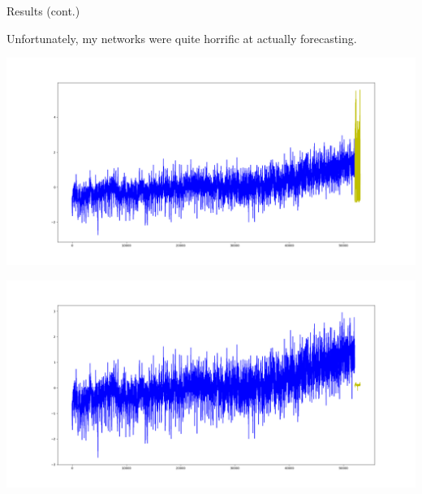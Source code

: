 \documentclass{beamer}
\begin{document}
\begin{frame}{Results (cont.)}

  Unfortunately, my networks were quite horrific at actually forecasting.\pause

  \begin{center}
    \includegraphics[scale=0.14]{erratic_predictions.png}
  \end{center}

  \begin{center}
    \includegraphics[scale=0.14]{squash_predictions.png}
  \end{center}

\end{frame}
\end{document}
